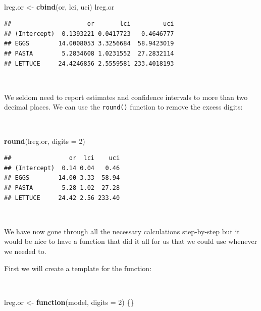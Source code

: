 \documentclass[12pt,a4paper]{book}
\newenvironment{Shaded}{\begin{snugshade}}{\end{snugshade}}
\newcommand{\ControlFlowTok}[1]{\textcolor[rgb]{0.13,0.29,0.53}{\textbf{#1}}}
\newcommand{\DataTypeTok}[1]{\textcolor[rgb]{0.13,0.29,0.53}{#1}}
\newcommand{\DecValTok}[1]{\textcolor[rgb]{0.00,0.00,0.81}{#1}}
\newcommand{\KeywordTok}[1]{\textcolor[rgb]{0.13,0.29,0.53}{\textbf{#1}}}
\newcommand{\NormalTok}[1]{#1}
\newcommand{\StringTok}[1]{\textcolor[rgb]{0.31,0.60,0.02}{#1}}
\theoremstyle{definition}
\theoremstyle{definition}
\theoremstyle{definition}
\theoremstyle{remark}
\begin{document}
~

\begin{Shaded}
\begin{Highlighting}[]
\NormalTok{lreg.or <-}\StringTok{ }\KeywordTok{cbind}\NormalTok{(or, lci, uci)}
\NormalTok{lreg.or}
\end{Highlighting}
\end{Shaded}

\begin{verbatim}
##                     or       lci         uci
## (Intercept)  0.1393221 0.0417723   0.4646777
## EGGS        14.0008053 3.3256684  58.9423019
## PASTA        5.2834608 1.0231552  27.2832114
## LETTUCE     24.4246856 2.5559581 233.4018193
\end{verbatim}

~

We seldom need to report estimates and confidence intervals to more than
two decimal places. We can use the \texttt{round()} function to remove
the excess digits:

~

\begin{Shaded}
\begin{Highlighting}[]
\KeywordTok{round}\NormalTok{(lreg.or, }\DataTypeTok{digits =} \DecValTok{2}\NormalTok{)}
\end{Highlighting}
\end{Shaded}

\begin{verbatim}
##                or  lci    uci
## (Intercept)  0.14 0.04   0.46
## EGGS        14.00 3.33  58.94
## PASTA        5.28 1.02  27.28
## LETTUCE     24.42 2.56 233.40
\end{verbatim}

~

We have now gone through all the necessary calculations step-by-step but
it would be nice to have a function that did it all for us that we could
use whenever we needed to.

First we will create a template for the function:

~

\begin{Shaded}
\begin{Highlighting}[]
\NormalTok{lreg.or <-}\StringTok{ }\ControlFlowTok{function}\NormalTok{(model, }\DataTypeTok{digits =} \DecValTok{2}\NormalTok{) \{\}}
\end{Highlighting}
\end{Shaded}

~
\end{document}

